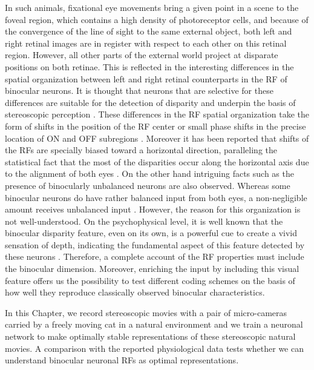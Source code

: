 In such animals, fixational eye movements bring a given point in a scene to
the foveal region, which contains a high density of photoreceptor cells,
and because of the convergence of the line of sight to the same external
object, both left and right retinal images are in register with respect to
each other on this retinal region. However, all other parts of the external
world project at disparate positions on both retinae. This is reflected in
the interesting differences in the spatial organization between left and
right retinal counterparts in the RF of binocular neurons. It is thought
that neurons that are selective for these differences are suitable for the
detection of disparity \citep{ohzawa1990a} and underpin the basis of
stereoscopic perception \citep{cumming2001a}.  These differences in the RF
spatial organization take the form of shifts in the position of the RF
center or small phase shifts in the precise location of ON and OFF
subregions \citep{anzai1997a}.  Moreover it has been reported that shifts
of the RFs are specially biased toward a horizontal direction, paralleling
the statistical fact that the most of the disparities occur along the
horizontal axis due to the alignment of both eyes \citep{cumming2002a}. On
the other hand intriguing facts such as the presence of binocularly
unbalanced neurons are also observed. Whereas some binocular neurons do
have rather balanced input from both eyes, a non-negligible amount receives
unbalanced input \citep{wiesel1974a,levay1985a}. However, the reason for
this organization is not well-understood. On the psychophysical level, it
is well known that the binocular disparity feature, even on its own, is a
powerful cue to create a vivid sensation of depth, indicating the
fundamental aspect of this feature detected by these neurons
\citep{julesz1960a}. Therefore, a complete account of the RF properties
must include the binocular dimension. Moreover, enriching the input by
including this visual feature offers us the possibility to test different
coding schemes on the basis of how well they reproduce classically observed
binocular characteristics. 

	
In this Chapter, we record stereoscopic movies with a pair of micro-cameras
carried by a freely moving cat in a natural environment and we train a
neuronal network to make optimally stable representations of these
stereoscopic natural movies. A comparison with the reported physiological
data tests whether we can understand binocular neuronal RFs as optimal
representations. 







